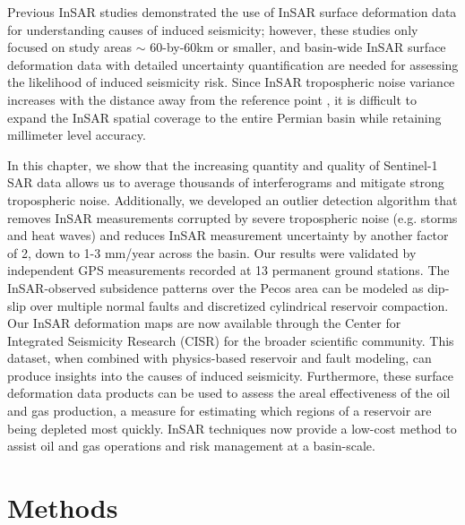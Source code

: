 Previous InSAR studies demonstrated the use of InSAR surface deformation data for understanding causes of induced seismicity; however, these studies only focused on study areas $ \sim $ 60-by-60km or smaller, and basin-wide InSAR surface deformation data with detailed uncertainty quantification are needed for assessing the likelihood of induced seismicity risk. Since InSAR tropospheric noise variance increases with the distance away from the reference point \citep{Emardson2003NeutralAtmosphericDelay}, it is difficult to expand the InSAR spatial coverage to the entire Permian basin while retaining millimeter level accuracy. 

In this chapter, we show that the increasing quantity and quality of Sentinel-1 SAR data allows us to average thousands of interferograms and mitigate strong tropospheric noise. Additionally, we developed an outlier detection algorithm that removes InSAR measurements corrupted by severe tropospheric noise (e.g. storms and heat waves) and reduces InSAR measurement uncertainty by another factor of 2, down to 1-3 mm/year across the basin. Our results were validated by independent GPS measurements recorded at 13 permanent ground stations. The InSAR-observed subsidence patterns over the Pecos area can be modeled as dip-slip over multiple normal faults and discretized cylindrical reservoir compaction. Our InSAR deformation maps are now available through the Center for Integrated Seismicity Research (CISR) for the broader scientific community. This dataset, when combined with physics-based reservoir and fault modeling, can produce insights into the causes of induced seismicity. Furthermore, these surface deformation data products can be used to assess the areal effectiveness of the oil and gas production, a measure for estimating which regions of a reservoir are being depleted most quickly. InSAR techniques now provide a low-cost method to assist oil and gas operations and risk management at a basin-scale.

\section{Methods}
